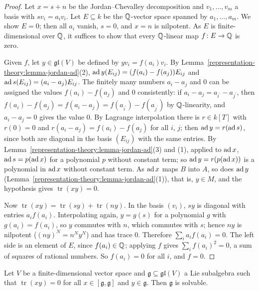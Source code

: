 \begin{proof}
Let $x = s + n$ be the Jordan--Chevalley decomposition and $v_1, \ldots, v_m$ a basis with $sv_i = a_iv_i$. Let $E \subseteq k$ be the $\mathbb{Q}$-vector space spanned by
$a_1, \ldots, a_m$. We show $E = 0$; then all $a_i$ vanish, $s = 0$, and $x = n$ is nilpotent. As $E$ is finite-dimensional over $\mathbb{Q}$, it suffices to show that every
$\mathbb{Q}$-linear map $f \colon E \to \mathbb{Q}$ is zero.

Given $f$, let $y \in \mathfrak{gl}(V)$ be defined by $yv_i = f(a_i)v_i$. By Lemma~\ref{representation-theory:lemma-jordan-ad}(2), $\operatorname{ad} y(E_{ij}) = (f(a_i) - f(a_j))E_{ij}$
and $\operatorname{ad} s(E_{ij}) = (a_i - a_j)E_{ij}$. The finitely many numbers $a_i - a_j$ and $0$ can be assigned the values $f(a_i) - f(a_j)$ and $0$ consistently: if
$a_i - a_j = a_{i^{\prime}} - a_{j^{\prime}}$, then $f(a_i) - f(a_j) = f(a_i - a_j) = f(a_{i^{\prime}}) - f(a_{j^{\prime}})$ by $\mathbb{Q}$-linearity, and $a_i - a_j = 0$ gives
the value $0$. By Lagrange interpolation there is $r \in k[T]$ with $r(0) = 0$ and $r(a_i - a_j) = f(a_i) - f(a_j)$ for all $i$, $j$; then $\operatorname{ad} y = r(\operatorname{ad} s)$, since both are
diagonal in the basis $(E_{ij})$ with the same entries. By Lemma~\ref{representation-theory:lemma-jordan-ad}(3) and (1), applied to $\operatorname{ad} x$, $\operatorname{ad} s = p(\operatorname{ad} x)$ for a polynomial
$p$ without constant term; so $\operatorname{ad} y = r(p(\operatorname{ad} x))$ is a polynomial in $\operatorname{ad} x$ without constant term. As $\operatorname{ad} x$ maps $B$ into $A$, so does $\operatorname{ad} y$
(Lemma~\ref{representation-theory:lemma-jordan-ad}(1)), that is, $y \in M$, and the hypothesis gives $\operatorname{tr}(xy) = 0$.

Now $\operatorname{tr}(xy) = \operatorname{tr}(sy) + \operatorname{tr}(ny)$. In the basis $(v_i)$, $sy$ is diagonal with entries $a_if(a_i)$. Interpolating again, $y = g(s)$ for a
polynomial $g$ with $g(a_i) = f(a_i)$, so $y$ commutes with $n$, which commutes with $s$; hence $ny$ is nilpotent ($(ny)^N = n^Ny^N$) and has trace $0$. Therefore
$\sum_ia_if(a_i) = 0$. The left side is an element of $E$, since $f(a_i) \in \mathbb{Q}$; applying $f$ gives $\sum_if(a_i)^2 = 0$, a sum of squares of rational numbers. So
$f(a_i) = 0$ for all $i$, and $f = 0$.
\end{proof}

\begin{theorem}\label{representation-theory:theorem-cartan-criterion}
Let $V$ be a finite-dimensional vector space and $\mathfrak{g} \subseteq \mathfrak{gl}(V)$ a Lie subalgebra such that $\operatorname{tr}(xy) = 0$ for all
$x \in [\mathfrak{g}, \mathfrak{g}]$ and $y \in \mathfrak{g}$. Then $\mathfrak{g}$ is solvable.
\end{theorem}

